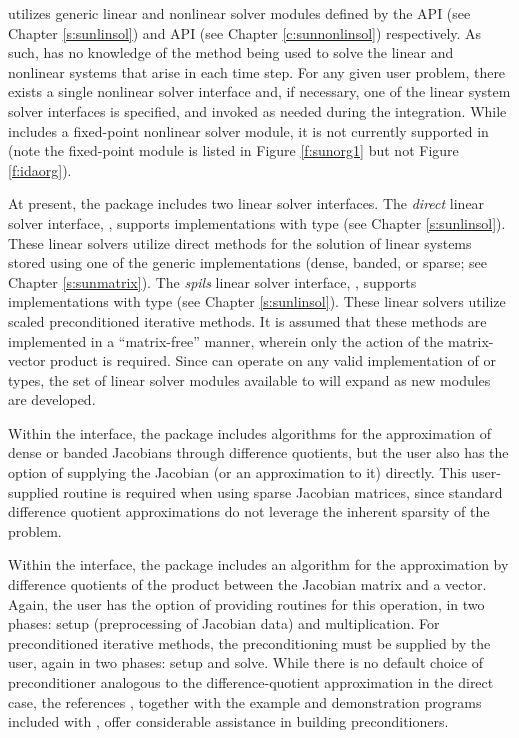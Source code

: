 {\ida} utilizes generic linear and nonlinear solver modules defined by the
{\sunlinsol} API (see Chapter \ref{s:sunlinsol}) and {\sunnonlinsol} API (see
Chapter \ref{c:sunnonlinsol}) respectively. As such, {\ida} has no knowledge
of the method being used to solve the linear and nonlinear systems that
arise in each time step. For any given user problem, there exists a single
nonlinear solver interface and, if necessary, one of the linear system solver
interfaces is specified, and invoked as needed during the integration. While
{\sundials} includes a fixed-point nonlinear solver module, it is not currently
supported in {\ida} (note the fixed-point module is listed in Figure
\ref{f:sunorg1} but not Figure \ref{f:idaorg}).

At present, the package includes two linear solver interfaces.  The
{\em direct} linear solver interface, {\idadls}, supports {\sunlinsol}
implementations with type  (see Chapter
\ref{s:sunlinsol}).  These linear solvers utilize direct methods for
the solution of linear systems stored using one of the {\sundials} generic
{\sunmatrix} implementations (dense, banded, or sparse; see
Chapter \ref{s:sunmatrix}).  
The {\em spils} linear solver interface, {\idaspils}, supports
{\sunlinsol} implementations with type 
(see Chapter \ref{s:sunlinsol}).  These linear solvers utilize scaled
preconditioned iterative methods.  It is assumed that these methods
are implemented in a ``matrix-free'' manner, wherein only the action
of the matrix-vector product is required.  Since {\ida} can
operate on any valid {\sunlinsol} implementation of
 or  types, the set of
linear solver modules available to {\ida} will expand as new
{\sunlinsol} modules are developed.

Within the {\idadls} interface, the package includes algorithms for the
approximation of dense or banded Jacobians through difference 
quotients, but the user also has the option of supplying the Jacobian
(or an approximation to it) directly.  This user-supplied 
routine is required when using sparse Jacobian matrices, since
standard difference quotient approximations do not leverage the
inherent sparsity of the problem.

Within the {\idaspils} interface, the package includes an algorithm for
the approximation by difference quotients of the product between the Jacobian
matrix and a vector. Again,
the user has the option of providing routines for this operation, in
two phases: setup (preprocessing of Jacobian data) and multiplication.
For preconditioned iterative methods,  
the preconditioning must be supplied by the user, again in two phases: 
setup and solve.  While there is no
default choice of preconditioner analogous to the difference-quotient
approximation in the direct case, the references
\cite{BrHi:89,Byr:92}, together with the example and demonstration
programs included with {\ida}, offer considerable assistance in
building preconditioners. 

